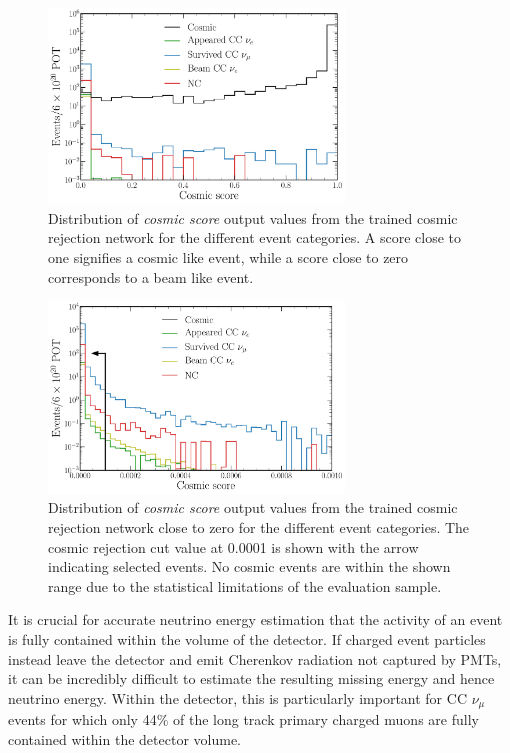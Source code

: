 \begin{figure} %
    \includegraphics[width=0.7\textwidth]{diagrams/6-cvn/chipsnet/final_cosmic_outputs.pdf}
    \caption[Distribution of cosmic score output values.]
    {Distribution of \emph{cosmic score} output values from the trained cosmic rejection network
        for the different event categories. A score close to one signifies a cosmic like event,
        while a score close to zero corresponds to a beam like event.}
    \label{fig:cosmic_outputs}
\end{figure}

\begin{figure} %
    \includegraphics[width=0.7\textwidth]{diagrams/6-cvn/chipsnet/final_cosmic_zoomed_outputs.pdf}
    \caption[Distribution of cosmic score output values close to zero.]
    {Distribution of \emph{cosmic score} output values from the trained cosmic rejection network
        close to zero for the different event categories. The cosmic rejection cut value at 0.0001
        is shown with the arrow indicating selected events. No cosmic events are within the shown
        range due to the statistical limitations of the evaluation sample.}
    \label{fig:cosmic_zoomed_outputs}
\end{figure}

It is crucial for accurate neutrino energy estimation that the activity of an event is fully
contained within the volume of the detector. If charged event particles instead leave the detector
and emit Cherenkov radiation not captured by PMTs, it can be incredibly difficult to estimate the
resulting missing energy and hence neutrino energy. Within the \chipsfive detector, this is
particularly important for CC $\nu_{\mu}$ events for which only 44\% of the long track primary
charged muons are fully contained within the detector volume.

